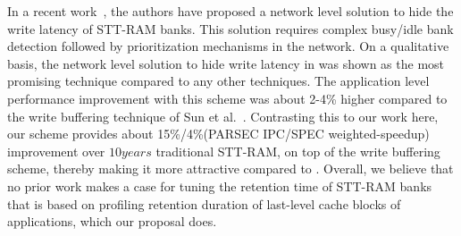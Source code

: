 In a recent work~\cite{mram-noc}, the authors have proposed a network level solution to hide the
write latency of STT-RAM banks. This solution requires complex busy/idle bank detection followed by
prioritization mechanisms in the network. On a qualitative basis, the network level solution to hide
write latency in \cite{mram-noc} was shown as the most promising technique compared to any other
techniques. The application level performance improvement with this scheme was about 2-4\% higher
compared to the write buffering technique of Sun et al.~\cite{gsun-hpca}. Contrasting this to our
work here, our scheme provides about 15\%/4\%(PARSEC IPC/SPEC weighted-speedup) improvement over $10years$
traditional STT-RAM, on top of the write buffering scheme, thereby making it more attractive compared
to \cite{mram-noc}. Overall, we believe that no prior work makes a case for tuning the retention time
of STT-RAM banks that is based on profiling retention duration of last-level cache blocks of
applications, which our proposal does.

